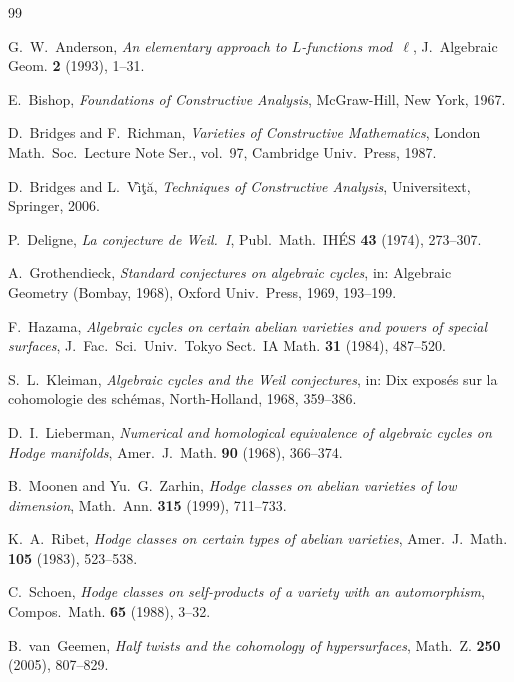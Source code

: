 \documentclass[11pt]{article}
\theoremstyle{plain}
\theoremstyle{definition}
\theoremstyle{remark}
\begin{document}

\begin{thebibliography}{99}

G.~W.~Anderson,
\emph{An elementary approach to $L$-functions mod~$\ell$},
J.~Algebraic Geom. \textbf{2} (1993), 1--31.

E.~Bishop,
\emph{Foundations of Constructive Analysis},
McGraw-Hill, New York, 1967.

D.~Bridges and F.~Richman,
\emph{Varieties of Constructive Mathematics},
London Math.\ Soc.\ Lecture Note Ser., vol.~97,
Cambridge Univ.~Press, 1987.

D.~Bridges and L.~V\^{\i}\c{t}\u{a},
\emph{Techniques of Constructive Analysis},
Universitext, Springer, 2006.

P.~Deligne,
\emph{La conjecture de Weil.~I},
Publ.\ Math.\ IH\'ES \textbf{43} (1974), 273--307.

A.~Grothendieck,
\emph{Standard conjectures on algebraic cycles},
in: Algebraic Geometry (Bombay, 1968), Oxford Univ.~Press, 1969, 193--199.

F.~Hazama,
\emph{Algebraic cycles on certain abelian varieties and powers of special
surfaces},
J.~Fac.~Sci.~Univ.~Tokyo Sect.~IA Math. \textbf{31} (1984), 487--520.

S.~L.~Kleiman,
\emph{Algebraic cycles and the Weil conjectures},
in: Dix expos\'es sur la cohomologie des sch\'emas,
North-Holland, 1968, 359--386.

D.~I.~Lieberman,
\emph{Numerical and homological equivalence of algebraic cycles on Hodge
manifolds},
Amer.~J.~Math. \textbf{90} (1968), 366--374.

B.~Moonen and Yu.~G.~Zarhin,
\emph{Hodge classes on abelian varieties of low dimension},
Math.~Ann. \textbf{315} (1999), 711--733.

K.~A.~Ribet,
\emph{Hodge classes on certain types of abelian varieties},
Amer.~J.~Math. \textbf{105} (1983), 523--538.

C.~Schoen,
\emph{Hodge classes on self-products of a variety with an automorphism},
Compos.~Math. \textbf{65} (1988), 3--32.

B.~van~Geemen,
\emph{Half twists and the cohomology of hypersurfaces},
Math.~Z. \textbf{250} (2005), 807--829.


\end{thebibliography}
\end{document}
